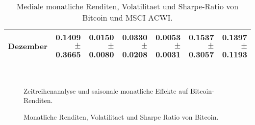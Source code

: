 \documentclass[a4paper,12pt]{article}
\begin{document}
\begin{table}[h]
{\begin{tabular}{l|r|r|r|r|r|r|}
\textbf{Dezember}  & 0.1409 $\pm$ 0.3665                          & {\color[HTML]{C0C0C0} 0.0150 $\pm$ 0.0080}                          & 0.0330 $\pm$ 0.0208                        & {\color[HTML]{C0C0C0} 0.0053 $\pm$ 0.0031}                          & 0.1537 $\pm$ 0.3057                          & {\color[HTML]{C0C0C0} 0.1397 $\pm$ 0.1193}                          \\ \hline
\end{tabular}
}\\
\caption{Mediale monatliche Renditen, Volatilitaet und Sharpe-Ratio von Bitcoin und MSCI ACWI.}
\label{AnhangTab3}
\end{table}


\begin{figure}[h] 
\caption{Zeitreihenanalyse und saisonale monatliche Effekte auf Bitcoin-Renditen.}
\label{AnhangAbb1} 
\end{figure}


\begin{figure}[h] 
\caption{Monatliche Renditen, Volatilitaet und Sharpe Ratio von Bitcoin.}
\label{AnhangAbb2} 
\end{figure}
\end{document}
